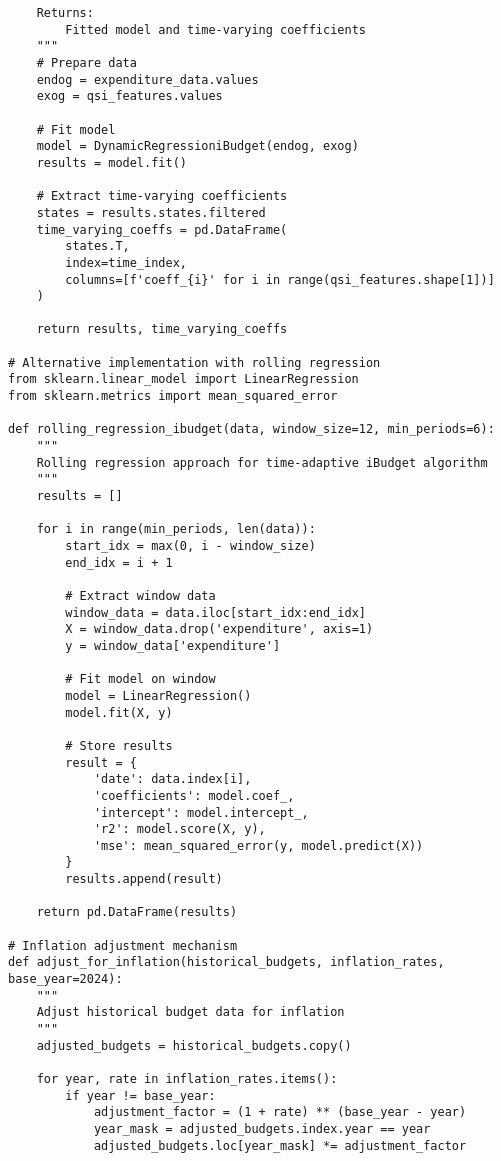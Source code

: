 \begin{lstlisting}
    Returns:
        Fitted model and time-varying coefficients
    """
    # Prepare data
    endog = expenditure_data.values
    exog = qsi_features.values
    
    # Fit model
    model = DynamicRegressioniBudget(endog, exog)
    results = model.fit()
    
    # Extract time-varying coefficients
    states = results.states.filtered
    time_varying_coeffs = pd.DataFrame(
        states.T, 
        index=time_index,
        columns=[f'coeff_{i}' for i in range(qsi_features.shape[1])]
    )
    
    return results, time_varying_coeffs

# Alternative implementation with rolling regression
from sklearn.linear_model import LinearRegression
from sklearn.metrics import mean_squared_error

def rolling_regression_ibudget(data, window_size=12, min_periods=6):
    """
    Rolling regression approach for time-adaptive iBudget algorithm
    """
    results = []
    
    for i in range(min_periods, len(data)):
        start_idx = max(0, i - window_size)
        end_idx = i + 1
        
        # Extract window data
        window_data = data.iloc[start_idx:end_idx]
        X = window_data.drop('expenditure', axis=1)
        y = window_data['expenditure']
        
        # Fit model on window
        model = LinearRegression()
        model.fit(X, y)
        
        # Store results
        result = {
            'date': data.index[i],
            'coefficients': model.coef_,
            'intercept': model.intercept_,
            'r2': model.score(X, y),
            'mse': mean_squared_error(y, model.predict(X))
        }
        results.append(result)
    
    return pd.DataFrame(results)

# Inflation adjustment mechanism
def adjust_for_inflation(historical_budgets, inflation_rates, base_year=2024):
    """
    Adjust historical budget data for inflation
    """
    adjusted_budgets = historical_budgets.copy()
    
    for year, rate in inflation_rates.items():
        if year != base_year:
            adjustment_factor = (1 + rate) ** (base_year - year)
            year_mask = adjusted_budgets.index.year == year
            adjusted_budgets.loc[year_mask] *= adjustment_factor
    

\end{lstlisting}
